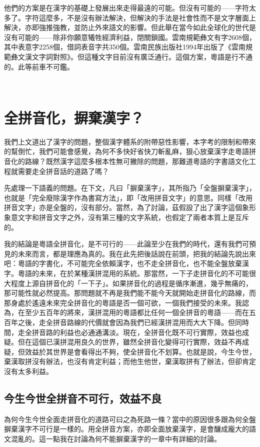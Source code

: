 \documentclass[a5paper, 12pt, openany]{book} %
\begin{document}
他們的方案是在漢字的基礎上發展出來走得最遠的可能。但沒有可能的——字符太多了。字符這麼多，不是沒有辦法解決，但解決的手法是社會性而不是文字層面上解決，亦即強推強教，並防止外來語文的影響。但此舉在當今如此全球化的世代是沒有可能的——除非你願意犧牲經濟利益，閉關鎖國。雲南規範彝文有字2608個，其中表意字2258個，借詞表音字共350個。雲南民族出版社1994年出版了《雲南規範彝文漢文字詞對照》。但這種文字目前沒有廣泛通行。這個方案，粵語是行不通的。此等前車不可鑑。

 \chapter{全拼音化，摒棄漢字？}

我們上文道出了漢字的問題，整個漢字體系的附帶惡性影響，本字考的限制和帶來的幫倒忙，我們可能會感覺，為何不多快好省快刀斬亂麻，狠心放棄漢字走粵語拼音化的路線？既然漢字這麼多根本性無可撇除的問題，那難道粵語的字書語文化工程就需要走全拼音話的道路了嗎？

先處理一下語義的問題。在下文，凡曰「摒棄漢字」，其所指乃「全盤摒棄漢字」，也就是「完全廢除漢字作為書寫方法」，即「改用拼音文字」的意思。同樣「改用拼音文字」亦是全盤的，沒有部分。當然，為了討論，茲假設了出了漢字這個象形象意文字和拼音文字之外，沒有第三種的文字系統，也假定了兩者本質上是互斥的。

我的結論是粵語全拼音化，是不可行的——此論至少在我們的時代，還有我們可預見的未來而言，都是理應為真的。我在此先把後話說在前頭，把我的結論先說出來吧：粵語的字書化，不可能完全依賴漢字，也不走全拼音化，也不能全盤放棄漢字。粵語的未來，在於某種漢拼混用的系統。那當然，一下子走拼音化的不可能很大程度上源自拼音化的「一下子」。如果拼音化的過程是循序漸進，幾乎無痛的，那可能性就必然提高。那問題就不再是我們能不能今天就開始走拼音化的路線，而那身處於遙遠未來完全拼音化的粵語是否一個可欲，一個我們接受的未來。我認為，在至少五百年的將來，漢拼混用的粵語都比任何一個全拼音的粵語——而在五百年之後，走全拼音路線的代價就會因為我們已經漢拼混用而大大下降。但同時間，走全拼音路的利益也必通通溝淡。現在，全拼音化既不可行實際，效益也成疑。但在這個已漢拼混用良久的世界，雖然全拼音化變得可行實際，效益不再成疑，但效益於其世界是會看得出不夠，使全拼音化不划算。也就是說，今生今世，棄漢取拼沒有辦法，也沒有肯定利益；而他生他世，棄漢取拼有了辦法，但卻肯定沒有太多利益。

\section{今生今世全拼音不可行，效益不良}

為何今生今世全面走拼音化的道路可曰之為死路一條？當中的原因很多跟為何全盤摒棄漢字不可行是一樣的。用全拼音方案，亦即全面放棄漢字，是會釀成龐大的語文混亂的。這一點我在討論為何不能摒棄漢字的一章中有詳細的討論。
\end{document}
